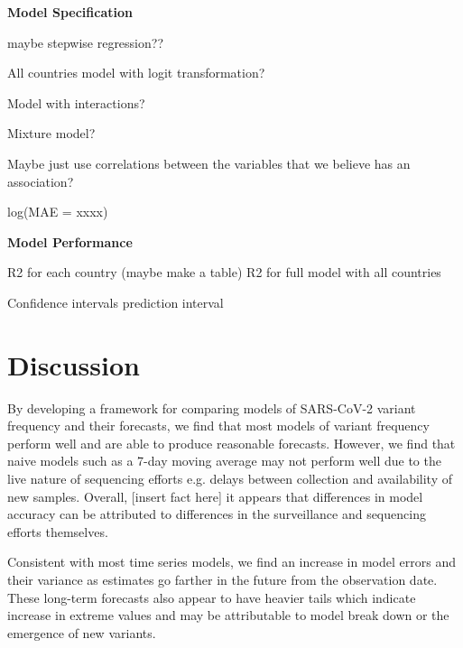 \documentclass[11pt,oneside,letterpaper]{article}
\begin{document}
\textbf{Model Specification}

maybe stepwise regression??

All countries model with logit transformation?

Model with interactions?

Mixture model?


Maybe just use correlations between the variables that we believe has an association?


log(MAE = xxxx)


\textbf{Model Performance}

R2 for each country (maybe make a table)
R2 for full model with all countries

Confidence intervals
prediction interval


% 


\section*{Discussion}




By developing a framework for comparing models of SARS-CoV-2 variant frequency and their forecasts, we find that most models of variant frequency perform well and are able to produce reasonable forecasts.
However, we find that naive models such as a 7-day moving average may not perform well due to the live nature of sequencing efforts e.g. delays between collection and availability of new samples.
Overall, [insert fact here] it appears that differences in model accuracy can be attributed to differences in the surveillance and sequencing efforts themselves.

Consistent with most time series models, we find an increase in model errors and their variance as estimates go farther in the future from the observation date.
These long-term forecasts also appear to have heavier tails which indicate increase in extreme values and may be attributable to model break down or the emergence of new variants.  

%
\end{document}
